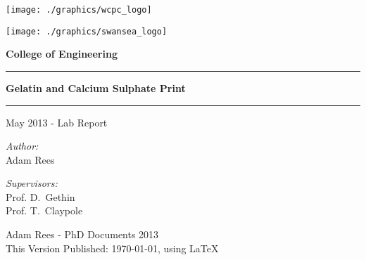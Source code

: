 \begin{titlepage}
\begin{center}
\thispagestyle{plain}
\vspace*{1.0cm}
\texttt{[image: ./graphics/wcpc\_logo]}

\texttt{[image: ./graphics/swansea\_logo]}

\textbf{\LARGE{College of Engineering}}
\vspace{1cm}
\hrule
\vspace{0.5cm}
{\Huge \textbf{Gelatin and Calcium Sulphate Print}} \\[0.5cm]
\hrule
\vspace{0.5cm}
\LARGE{May 2013 - Lab Report}
\vspace{1cm}

\begin{minipage}{0.4\textwidth}
\begin{flushleft} 
\LARGE \emph{Author:}\\ Adam Rees
\end{flushleft}
\end{minipage}
\begin{minipage}{0.4\textwidth}
\begin{flushright}
\LARGE \emph{Supervisors:} \\ Prof. D.~Gethin \\ Prof. T.~Claypole
\end{flushright}
\end{minipage}

\vfill

\large {Adam Rees - PhD Documents 2013}\\
This Version Published: \today, using \LaTeX


\end{center}
\end{titlepage}